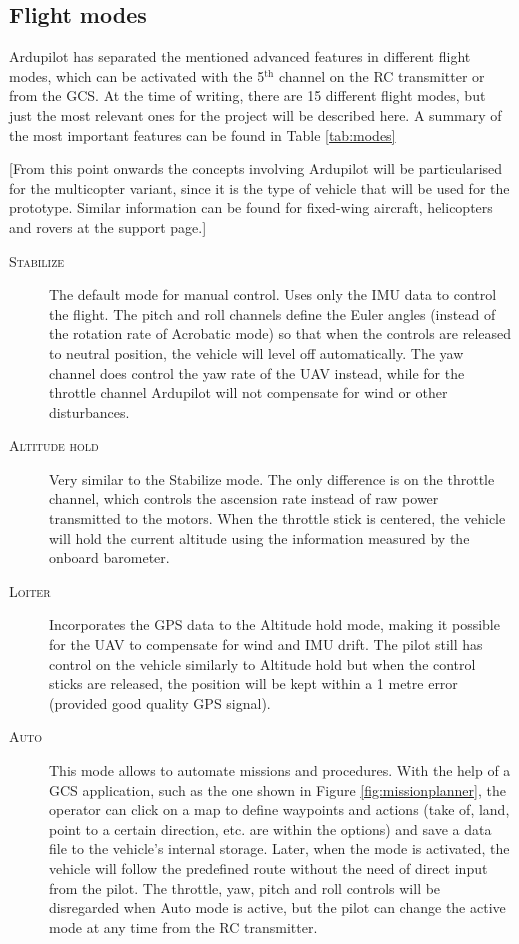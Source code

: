 \subsection{Flight modes}

Ardupilot has separated the mentioned advanced features in different flight modes, which can be activated with the 5$^{\text{th}}$ channel on the RC transmitter or from the GCS.
At the time of writing, there are 15 different flight modes, but just the most relevant ones for the project will be described here.
A summary of the most important features can be found in Table \ref{tab:modes}

\noindent \small{[From this point onwards the concepts involving Ardupilot will be particularised for the multicopter variant, since it is the type of vehicle that will be used for the prototype.
Similar information can be found for fixed-wing aircraft, helicopters and rovers at the support page.]

\begin{description}

	\item[\scshape Stabilize] 
		The default mode for manual control.
		Uses only the IMU data to control the flight.
		The pitch and roll channels define the Euler angles (instead of the rotation rate of Acrobatic mode) so that when the controls are released to neutral position, the vehicle will level off automatically.
		The yaw channel does control the yaw rate of the UAV instead, while for the throttle channel
		Ardupilot will not compensate for wind or other disturbances.

	\item[\scshape Altitude hold]
		Very similar to the Stabilize mode.
		The only difference is on the throttle channel, which controls the ascension rate instead of raw power transmitted to the motors.
		When the throttle stick is centered, the vehicle will hold the current altitude using the information measured by the onboard barometer.

	\item[\scshape Loiter]
		Incorporates the GPS data to the Altitude hold mode, making it possible for the UAV to compensate for wind and IMU drift.
		The pilot still has control on the vehicle similarly to Altitude hold but when the control sticks are released, the position will be kept within a 1 metre error (provided good quality GPS signal).

	\item[\scshape Auto]
		This mode allows to automate missions and procedures.
		With the help of a GCS application, such as the one shown in Figure \ref{fig:missionplanner}, the operator can click on a map to define waypoints and actions (take of, land, point to a certain direction, etc. are within the options) and save a data file to the vehicle's internal storage.
		Later, when the mode is activated, the vehicle will follow the predefined route without the need of direct input from the pilot.
		The throttle, yaw, pitch and roll controls will be disregarded when Auto mode is active, but the pilot can change the active mode at any time from the RC transmitter.


\end{description}}
